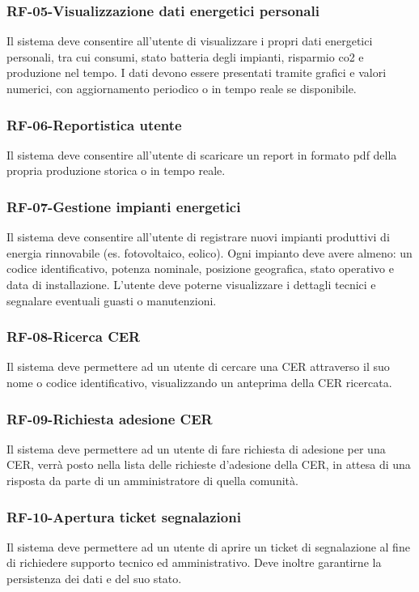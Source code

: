 \subsubsection*{RF-05-Visualizzazione dati energetici personali}
Il sistema deve consentire all'utente di visualizzare i propri dati energetici personali, tra cui consumi, stato batteria degli impianti, risparmio co2 e produzione nel tempo. I dati devono essere presentati tramite grafici e valori numerici, con aggiornamento periodico o in tempo reale se disponibile.
\subsubsection*{RF-06-Reportistica utente}
Il sistema deve consentire all'utente di scaricare un report in formato pdf della propria produzione storica o in tempo reale.

\subsubsection*{RF-07-Gestione impianti energetici}
Il sistema deve consentire all'utente di registrare nuovi impianti produttivi di energia rinnovabile (es. fotovoltaico, eolico). Ogni impianto deve avere almeno: un codice identificativo, potenza nominale, posizione geografica, stato operativo e data di installazione. L'utente deve poterne visualizzare i dettagli tecnici e segnalare eventuali guasti o manutenzioni.

\subsubsection*{RF-08-Ricerca CER}
Il sistema deve permettere ad un utente di cercare una CER attraverso il suo nome o codice identificativo, visualizzando un anteprima della CER ricercata.

\subsubsection*{RF-09-Richiesta adesione CER}
Il sistema deve permettere ad un utente di fare richiesta di adesione per una CER, verrà posto nella lista delle richieste d'adesione della CER, in attesa di una risposta da parte di un amministratore di quella comunità.

\subsubsection*{RF-10-Apertura ticket segnalazioni}
Il sistema deve permettere ad un utente di aprire un ticket di segnalazione al fine di richiedere supporto tecnico ed amministrativo. Deve inoltre garantirne la persistenza dei dati e del suo stato.

